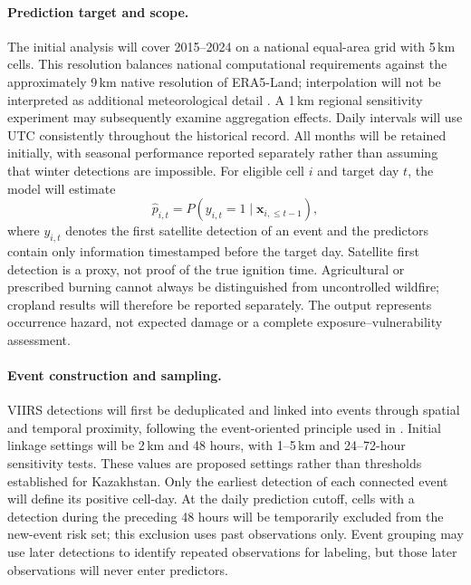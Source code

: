 \documentclass[pdflatex,sn-mathphys-num]{sn-jnl}
\begin{document}
\paragraph{Prediction target and scope.}
The initial analysis will cover 2015--2024 on a national equal-area grid with 5\,km cells. This resolution balances national computational requirements against the approximately 9\,km native resolution of ERA5-Land; interpolation will not be interpreted as additional meteorological detail \cite{munozsabater2021era5land}. A 1\,km regional sensitivity experiment may subsequently examine aggregation effects. Daily intervals will use UTC consistently throughout the historical record. All months will be retained initially, with seasonal performance reported separately rather than assuming that winter detections are impossible. For eligible cell $i$ and target day $t$, the model will estimate
\begin{equation}
\hat p_{i,t}=P(y_{i,t}=1\mid\mathbf{x}_{i,\leq t-1}),
\end{equation}
where $y_{i,t}$ denotes the first satellite detection of an event and the predictors contain only information timestamped before the target day. Satellite first detection is a proxy, not proof of the true ignition time. Agricultural or prescribed burning cannot always be distinguished from uncontrolled wildfire; cropland results will therefore be reported separately. The output represents occurrence hazard, not expected damage or a complete exposure--vulnerability assessment.

\paragraph{Event construction and sampling.}
VIIRS detections will first be deduplicated and linked into events through spatial and temporal proximity, following the event-oriented principle used in \cite{ahajjam2025alaska}. Initial linkage settings will be 2\,km and 48 hours, with 1--5\,km and 24--72-hour sensitivity tests. These values are proposed settings rather than thresholds established for Kazakhstan. Only the earliest detection of each connected event will define its positive cell-day. At the daily prediction cutoff, cells with a detection during the preceding 48 hours will be temporarily excluded from the new-event risk set; this exclusion uses past observations only. Event grouping may use later detections to identify repeated observations for labeling, but those later observations will never enter predictors.
\end{document}
